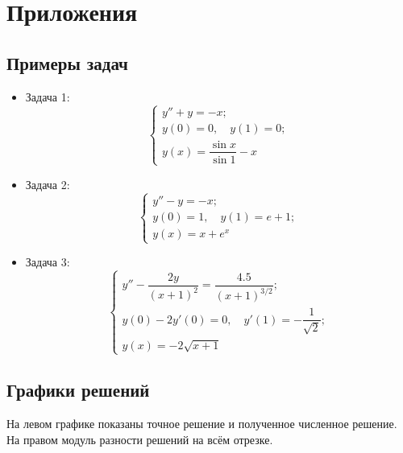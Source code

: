 \section{Приложения}

\subsection{Примеры задач} \label{examples}

\begin{itemize}
    \item Задача 1:
    \[
    \begin{cases}
        y'' + y = -x; \\
        y(0) = 0, \quad y(1) = 0; \\
        y(x) = \dfrac{\sin x}{\sin 1} - x
    \end{cases}
    \]\label{z1}

    \item Задача 2:
    \[
    \begin{cases}
        y'' - y = -x; \\
        y(0) = 1, \quad y(1) = e + 1; \\
        y(x) = x + e^x
    \end{cases}
    \]\label{z2}
    
    \item Задача 3:
    \[
    \begin{cases}
        y'' - \dfrac{2y}{(x+1)^2} = \dfrac{4.5}{(x+1)^{3/2}}; \\
        y(0) - 2y'(0) = 0, \quad y'(1) = -\dfrac{1}{\sqrt{2}}; \\
        y(x) = -2\sqrt{x+1}
    \end{cases}
    \]\label{z3}
\end{itemize}

\subsection{Графики решений} \label{plots}
На левом графике показаны точное решение и полученное численное решение. На правом модуль разности решений на всём отрезке.

